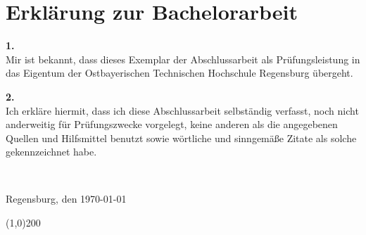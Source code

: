 \thispagestyle{empty}
\chapter*{Erklärung zur Bachelorarbeit}

\bigskip
\bigskip 
\bigskip 

\textbf{1.}\\[1ex]
    Mir ist bekannt, dass dieses Exemplar der Abschlussarbeit als Prüfungsleistung in das Eigentum der Ostbayerischen Technischen Hochschule Regensburg übergeht.

\textbf{2.}\\[1ex]
    Ich erkläre hiermit, dass ich diese Abschlussarbeit selbständig verfasst, noch nicht anderweitig für Prüfungszwecke vorgelegt, keine anderen als die angegebenen Quellen und Hilfsmittel benutzt sowie wörtliche und sinngemäße Zitate als solche gekennzeichnet habe.

\bigskip 
\bigskip 
\bigskip 
~\hfill\begin{minipage}{.5\textwidth}

Regensburg, den \today

\bigskip 
\bigskip

\line(1,0){200}
\newline
\stud

\end{minipage}
